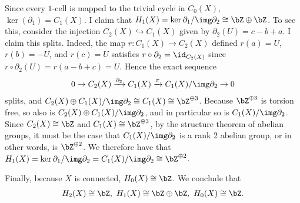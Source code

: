 \begin{homework}[e]
\begin{prf}
  Since every $1$-cell is mapped to the trivial cycle in $C_0(X)$, $\ker(\partial_1) = C_1(X)$. I claim that $H_1(X) = \ker\partial_1/\img \partial_2 \cong \bZ\oplus \bZ$. To see this, consider the injection $C_2(X) \hookrightarrow C_1(X)$ given by $\partial_2(U) =  c - b + a$. I claim this splits. Indeed, the map $r:C_1(X) \to C_2(X)$ defined $r(a) = U$, $r(b) = -U$, and $r(c) = U$ satisfies $r\circ \partial_2 = \id_{C_2(X)}$ since $r\circ \partial_2(U) = r(a - b + c) = U$. Hence the exact sequence
  \begin{align*}
    0 \to C_2(X) \xrightarrow{\partial_2} C_1(X) \xrightarrow{\pi} C_1(X)/\img \partial_2 \to 0
  \end{align*}
  splits, and $C_2(X) \oplus C_1(X)/\img \partial_2 \cong C_1(X) \cong \bZ^{\oplus 3}$. Because $\bZ^{\oplus 3}$ is torsion free, so also is $C_2(X) \oplus C_1(X)/\img\partial_2$, and in particular so is $C_1(X)/\img \partial_2$. Since $C_2(X) \cong \bZ$ and $C_1(X) \cong \bZ^{\oplus 3}$, by the structure theorem of abelian groups, it must be the case that $C_1(X)/\img\partial_2$ is a rank 2 abelian group, or in other words, is $\bZ^{\oplus 2}$. We therefore have that $H_1(X) = \ker \partial_1/\img\partial_2 = C_1(X)/\img \partial_2 \cong \bZ^{\oplus 2}$.

  Finally, because $X$ is connected, $H_0(X) \cong \bZ$. We conclude that
  \begin{align*}
    H_2(X) \cong \bZ, ~ H_1(X) \cong \bZ\oplus \bZ, ~ H_0(X) \cong \bZ.
  \end{align*}
\end{prf}


\end{homework}
